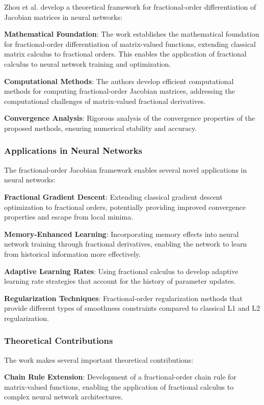 Zhou et al. develop a theoretical framework for fractional-order differentiation of Jacobian matrices in neural networks:

\textbf{Mathematical Foundation}: The work establishes the mathematical foundation for fractional-order differentiation of matrix-valued functions, extending classical matrix calculus to fractional orders. This enables the application of fractional calculus to neural network training and optimization.

\textbf{Computational Methods}: The authors develop efficient computational methods for computing fractional-order Jacobian matrices, addressing the computational challenges of matrix-valued fractional derivatives.

\textbf{Convergence Analysis}: Rigorous analysis of the convergence properties of the proposed methods, ensuring numerical stability and accuracy.

\subsubsection{Applications in Neural Networks}

The fractional-order Jacobian framework enables several novel applications in neural networks:

\textbf{Fractional Gradient Descent}: Extending classical gradient descent optimization to fractional orders, potentially providing improved convergence properties and escape from local minima.

\textbf{Memory-Enhanced Learning}: Incorporating memory effects into neural network training through fractional derivatives, enabling the network to learn from historical information more effectively.

\textbf{Adaptive Learning Rates}: Using fractional calculus to develop adaptive learning rate strategies that account for the history of parameter updates.

\textbf{Regularization Techniques}: Fractional-order regularization methods that provide different types of smoothness constraints compared to classical L1 and L2 regularization.

\subsubsection{Theoretical Contributions}

The work makes several important theoretical contributions:

\textbf{Chain Rule Extension}: Development of a fractional-order chain rule for matrix-valued functions, enabling the application of fractional calculus to complex neural network architectures.

